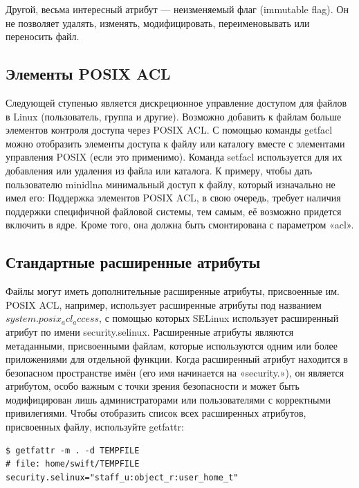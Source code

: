 \documentclass[10pt]{book}
\begin{document}
Другой, весьма интересный атрибут — неизменяемый флаг (immutable flag). Он не позволяет удалять, изменять, модифицировать, переименовывать или переносить файл. 

\subsection{Элементы POSIX ACL}

Следующей ступенью является дискреционное управление доступом для файлов в Linux (пользователь, группа и другие). Возможно добавить к файлам больше элементов контроля доступа через POSIX ACL.
С помощью команды getfacl можно отобразить элементы доступа к файлу или каталогу вместе с элементами управления POSIX (если это применимо). Команда setfacl используется для их добавления или удаления из файла или каталога. 
К примеру, чтобы дать пользователю minidlna минимальный доступ к файлу, который изначально не имел его:
Поддержка элементов POSIX ACL, в свою очередь, требует наличия поддержки специфичной файловой системы, тем самым, её возможно придется включить в ядре. Кроме того, она должна быть смонтирована с параметром «acl».

\subsection{Стандартные расширенные атрибуты}
Файлы могут иметь дополнительные расширенные атрибуты, присвоенные им. POSIX ACL, например, использует расширенные атрибуты под названием $system.posix_acl_access$, с помощью которых SELinux использует расширенный атрибут по имени security.selinux. Расширенные атрибуты являются метаданными, присвоенными файлам, которые используются одним или более приложениями для отдельной функции.
Когда расширенный атрибут находится в безопасном пространстве имён (его имя начинается на «security.»), он является атрибутом, особо важным с точки зрения безопасности и может быть модифицирован лишь администраторами или пользователями с корректными привилегиями.
Чтобы отобразить список всех расширенных атрибутов, присвоенных файлу, используйте getfattr:

\vspace{3mm}
\begin{tcolorbox}
\begin{lstlisting}
$ getfattr -m . -d TEMPFILE
# file: home/swift/TEMPFILE
security.selinux="staff_u:object_r:user_home_t"
\end{lstlisting}
\end{tcolorbox}
\end{document}
